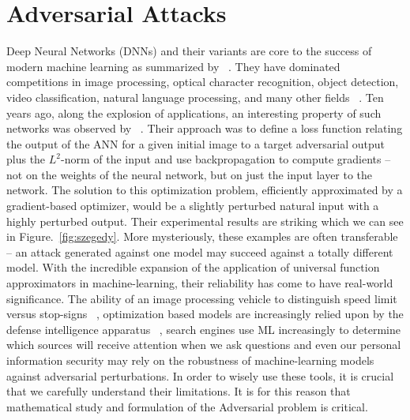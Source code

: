 \chapter{Adversarial Attacks}

\label{Chapter2} %

Deep Neural Networks (DNNs) and their variants are core to the success
of modern machine learning as summarized by ~\citet{prakash2018}. They
have dominated competitions in image processing, optical character
recognition, object detection, video classification, natural language
processing, and many other fields ~\citet{SCHMIDHUBER201585}. Ten years
ago, along the explosion of applications, an interesting property of
such networks was observed by ~\citet{szegedy2013}. Their approach was to define a loss function
relating the output of the ANN for a given initial image to a target adversarial 
output plus the $L^2$-norm of the input and use backpropagation to
compute gradients -- not on the weights of the neural network, but on
just the input layer to the network. The solution to this optimization
problem, efficiently approximated by a gradient-based optimizer, would
be a slightly perturbed natural input with a highly perturbed
output. Their experimental results are striking which we can see in
Figure.~\ref{fig:szegedy}.  More mysteriously, these examples
are often transferable -- an attack generated against one
model may succeed against a totally different model. With the
incredible expansion of the application of universal function
approximators in machine-learning, their reliability has come to have
real-world significance. The ability of an image processing vehicle to
distinguish speed limit versus stop-signs ~\citep{DBLP:journals/corr/EvtimovEFKLPRS17},
optimization based models are increasingly relied upon by the defense
intelligence apparatus ~\citep{hutchins2011intelligence}, search
engines use ML increasingly to
determine which sources will receive attention when we ask questions
and even our personal information security may rely on the robustness
of machine-learning models against adversarial perturbations. In order
to wisely use these tools, it is crucial that we carefully understand
their limitations. It is for this reason that mathematical study and
formulation of the Adversarial problem is critical. 


